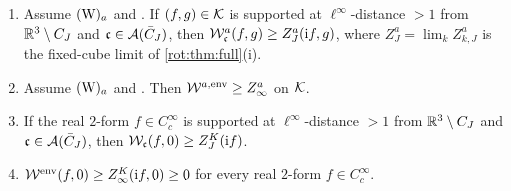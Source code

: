 \begin{lemma}\label{rot:lem:free}
\begin{enumerate}[label=\textup{(\alph*)},leftmargin=*]
\item Assume $(\mathrm W)_{a}$ and \Ka. If $(f,g)\in\mathcal K$ is supported at $\ell^\infty$-distance $>1$ from $\mathbb R^3\setminus C_J$ and
$\mathfrak c\in\mathcal A(\bar C_J)$, then $\mathcal W^a_{\mathfrak c}(f,g)\ge Z^a_J(\mathrm if,g)$, where $Z^a_J=\lim_kZ^a_{k,J}$ is the fixed-cube limit of
\cref{rot:thm:full}(i).
\item Assume $(\mathrm W)_{a}$ and \Ka. Then $\mathcal W^{a,\mathrm{env}}\ge Z^a_\infty$ on $\mathcal K$.
\item If the real $2$-form $f\in C^\infty_c$ is supported at $\ell^\infty$-distance $>1$ from $\mathbb R^3\setminus C_J$ and
$\mathfrak c\in\mathcal A(\bar C_J)$, then $\mathcal W_{\mathfrak c}(f,0)\ge Z^{K}_{J}(\mathrm if)$.
\item $\mathcal W^{\mathrm{env}}(f,0)\ge Z^{K}_{\infty}(\mathrm if,0)\ge0$ for every real $2$-form $f\in C^\infty_c$.
\end{enumerate}
\end{lemma}

